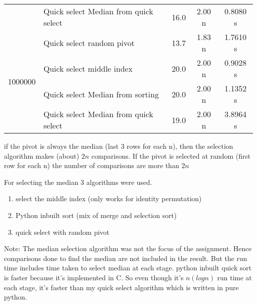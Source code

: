 \documentclass{homeworg}
\begin{document}
\begin{table}[htbp]
\begin{tabular}{llccc}
            & Quick select Median from quick select &                 16.0 &               \cellcolor{green} 2.00 n &   0.8080 s \\
    \cline{1-5}
    \multirow{4}{*}{1000000} & Quick select random pivot &                 13.7 &               1.83 n &   1.7610 s \\
            & Quick select middle index &                 20.0 &               \cellcolor{green} 2.00 n &   0.9028 s \\
            & Quick select Median from sorting &                 20.0 &               \cellcolor{green} 2.00 n &   1.1352 s \\
            & Quick select Median from quick select &                 19.0 &               \cellcolor{green} 2.00 n &   3.8964 s \\
    \bottomrule
    \end{tabular}

\end{table}

if the pivot is always the median (last 3 rows for each n), then the selection algorithm makes (about) $2n$ comparisons. If the pivot is selected at random (first row for each n) the number of comparisons are more than $2n$

For selecting the median 3 algorithms were used. 
\begin{enumerate}
    \item select the middle index (only works for identity permutation)
    \item Python inbuilt sort (mix of merge and selection sort)
    \item quick select with random pivot
\end{enumerate}

Note:
The median selection algorithm was not the focus of the assignment. Hence comparisons done to find the median are not included in the result. But the run time includes time taken to select median at each stage. python inbuilt quick sort is faster because it's implemented in C. So even though it's $n (log n)$ run time at each stage, it's faster than my quick select algorithm which is written in pure python.
\end{document}
